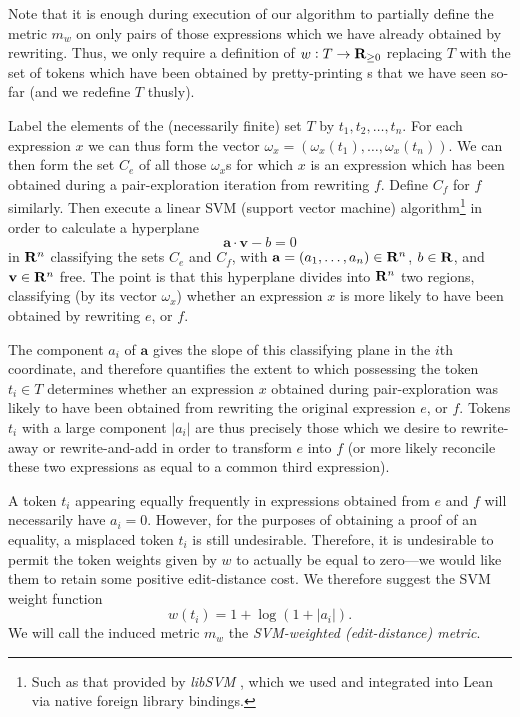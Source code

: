 \documentclass[12pt]{easychair}
\begin{document}
Note that it is enough during execution of our algorithm to partially define the metric $m_w$ on only pairs of those expressions which we have already obtained by rewriting. Thus, we only require a definition of $w : T \to \mathbf{R}_{\geq 0}$ replacing $T$ with the set of tokens which have been obtained by pretty-printing \expr{}s that we have seen so-far (and we redefine $T$ thusly).

Label the elements of the (necessarily finite) set $T$ by $t_1, t_2, \ldots, t_n$. For each expression $x$ we can thus form the vector $\omega_x = (\omega_x(t_1), \ldots, \omega_x(t_n))$. We can then form the set $C_e$ of all those $\omega_x$s for which $x$ is an expression which has been obtained during a pair-exploration iteration from rewriting $f$. Define $C_f$ for $f$ similarly. Then execute a linear SVM (support vector machine) algorithm\footnote{Such as that provided by \textit{libSVM} \cite{chang2011libsvm}, which we used and integrated into Lean via native foreign library bindings.} in order to calculate a hyperplane
\begin{equation*}
  \mathbf{a} \cdot \mathbf{v} - b = 0
\end{equation*}
in $\mathbf{R}^{n}$ classifying the sets $C_e$ and $C_f$, with $\mathbf{a} = (a_1, \ldots, a_n) \in \mathbf{R}^n$, $b \in \mathbf{R}$, and $\mathbf{v} \in \mathbf{R}^n$ free. The point is that this hyperplane divides into $\mathbf{R}^n$ two regions, classifying (by its vector $\omega_x$) whether an expression $x$ is more likely to have been obtained by rewriting $e$, or $f$.

The component $a_i$ of $\mathbf{a}$ gives the slope of this classifying plane in the $i$th coordinate, and therefore quantifies the extent to which possessing the token $t_i \in T$ determines whether an expression $x$ obtained during pair-exploration was likely to have been obtained from rewriting the original expression $e$, or $f$. Tokens $t_i$ with a large component $\lvert a_i \rvert$ are thus precisely those which we desire to rewrite-away or rewrite-and-add in order to transform $e$ into $f$ (or more likely reconcile these two expressions as equal to a common third expression).

A token $t_i$ appearing equally frequently in expressions obtained from $e$ and $f$ will necessarily have $a_i = 0$. However, for the purposes of obtaining a proof of an equality, a misplaced token $t_i$ is still undesirable. Therefore, it is undesirable to permit the token weights given by $w$ to actually be equal to zero---we would like them to retain some positive edit-distance cost. We therefore suggest the SVM weight function
\begin{equation*}
  w(t_i) = 1 + \log(1 + \lvert a_i \rvert).
\end{equation*}
We will call the induced metric $m_w$ the \textit{SVM-weighted (edit-distance) metric}.
\end{document}
